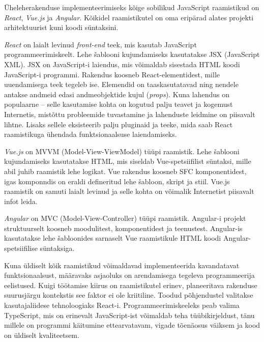 Üheleherakenduse implementeerimiseks kõige sobilikud JavaScript raamistikud on \textit{React}, \textit{Vue.js}
ja \textit{Angular}. Kõikidel raamistikutel on oma eripärad alates projekti arhitektuurist kuni 
koodi süntaksini. 

\textit{React} on laialt levinud \textit{front-end} teek, mis kasutab JavaScript programmeerimiskeelt. 
Lehe šablooni kujundamiseks kasutatakse JSX (JavaScript XML). JSX on JavaScript-i laiendus, mis võimaldab
sisestada HTML koodi JavaScript-i programmi. Rakendus koosneb React-elementidest, mille uuendamisega teek
tegeleb ise. Elemendid on taaskasutatavad ning nendele antakse andmeid edasi andmeobjektide kujul (\textit{props}).
Kuna lahendus on populaarne -- selle kasutamise kohta on kogutud palju teavet ja kogemust Internetis, mistõttu
probleemide tuvastamine ja lahenduste leidmine on piisavalt lihtne. Lisaks sellele eksisteerib palju pluginaid
ja teeke, mida saab React raamistikuga ühendada funktsionaalsuse laiendamiseks. 

\textit{Vue.js} on MVVM (Model-View-ViewModel) tüüpi raamistik. Lehe šablooni kujundamiseks kasutatakse HTML, 
mis siseldab Vue-spetsiifilist süntaksi, mille abil juhib raamistik lehe logikat. Vue rakendus koosneb SFC 
komponentidest, igas komponndis on eraldi defineritud lehe šabloon, skript ja stiil. Vue.js raamistik on
samuti laialt levinud ja selle kohta on võimalik Internetist piisavalt infot leida.

\textit{Angular} on MVC (Model-View-Controller) tüüpi raamistik. Angular-i projekt struktuurselt koosneb
moodulitest, komponentidest ja teenustest. Angular-is kasutatakse lehe šabloonides sarnaselt Vue raamistikule
HTML koodi Angular-spetsiifilise süntaksiga. 

Kuna üldiselt kõik raamistikud võimaldavad implementeerida kavandatavat funktsionaalsust, määravaks asjaoluks
on arendamisega tegeleva programmeerija eelistused. Kuigi töötamise kiirus on raamistikutel erinev, 
planeeritava rakenduse suurusjärgu kontekstis see faktor ei ole kriitiline. Toodud põhjendustel valitakse 
kasutajaliidese tehnoloogiaks React-i. Programmeerimiskeeleks peab valima TypeScript, mis on erinevalt
JavaScript-ist võimaldab teha tüübikirjeldust, tänu millele on programmi käitumine ettearvatavam, vigade
tõenäosus väiksem ja kood on üldiselt kvaliteetsem. 



